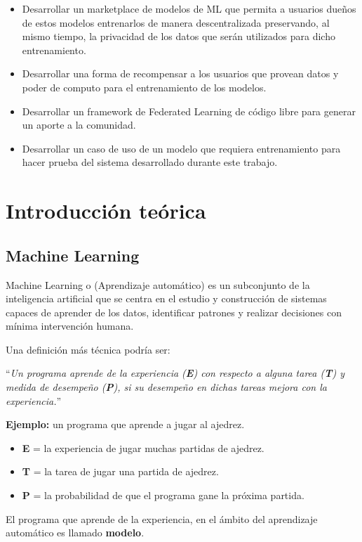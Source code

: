 \documentclass[
11pt, %
oneside, %
spanish, %
singlespacing, %
parskip, %
headsepline, %
chapterinoneline, %
]{MastersDoctoralThesis} %
\begin{document}
\begin{itemize}
\item Desarrollar un marketplace de modelos de ML que permita a usuarios dueños de estos modelos entrenarlos de manera descentralizada preservando, al mismo tiempo, la privacidad de los datos que serán utilizados para dicho entrenamiento.
\item Desarrollar una forma de recompensar a los usuarios que provean datos y poder de computo para el entrenamiento de los modelos.
\item Desarrollar un framework de Federated Learning de código libre para generar un aporte a la comunidad.
\item Desarrollar un caso de uso de un modelo que requiera entrenamiento para hacer prueba del sistema desarrollado durante este trabajo.
\end{itemize}


\chapter{Introducción teórica}

\section{Machine Learning}
Machine Learning o (Aprendizaje automático) es un subconjunto de la inteligencia artificial que se centra en el estudio y construcción de sistemas capaces de aprender de los datos, identificar patrones y realizar decisiones con mínima intervención humana.

Una definición más técnica podría ser: 

``\textit{Un programa aprende de la experiencia (\textbf{E}) con respecto a alguna tarea (\textbf{T}) y medida de desempeño (\textbf{P}), si su desempeño en dichas tareas mejora con la experiencia.}''

\textbf{Ejemplo:} un programa que aprende a jugar al ajedrez.
\begin{itemize}
\item \textbf{E} = la experiencia de jugar muchas partidas de ajedrez.
\item \textbf{T} = la tarea de jugar una partida de ajedrez.
\item \textbf{P} = la probabilidad de que el programa gane la próxima partida.
\end{itemize}

El programa que aprende de la experiencia, en el ámbito del aprendizaje automático es llamado \textbf{modelo}.
\end{document}
